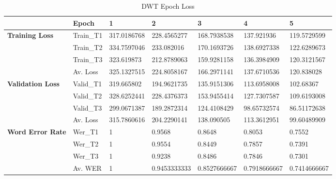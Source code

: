 \begin{table}[!ht]
    \centering
    \caption{DWT Epoch Loss}
    \begin{adjustbox}{width=\textwidth,keepaspectratio}
    \begin{tabular}{|l|l|l|l|l|l|l|}
    \hline
        \textbf{} & \textbf{Epoch} & \textbf{1} & \textbf{2} & \textbf{3} & \textbf{4} & \textbf{5} \\ \hline
        \textbf{Training Loss} & Train\_T1 & 317.0186768 & 228.4565277 & 168.7938538 & 137.921936 & 119.5729599 \\ \hline
        \textbf{} & Train\_T2 & 334.7597046 & 233.082016 & 170.1693726 & 138.6927338 & 122.6289673 \\ \hline
        \textbf{} & Train\_T3 & 323.619873 & 212.8789063 & 159.9281158 & 136.3984909 & 120.3121567 \\ \hline
        \textbf{} & Av. Loss & 325.1327515 & 224.8058167 & 166.2971141 & 137.6710536 & 120.838028 \\ \hline
        \textbf{Validation Loss} & Valid\_T1 & 319.665802 & 194.9621735 & 135.9151306 & 113.6958008 & 102.68367 \\ \hline
        \textbf{} & Valid\_T2 & 328.6252441 & 228.4376373 & 153.9455414 & 127.7307587 & 109.6193008 \\ \hline
        \textbf{} & Valid\_T3 & 299.0671387 & 189.2872314 & 124.4108429 & 98.65732574 & 86.51172638 \\ \hline
        \textbf{} & Av. Loss & 315.7860616 & 204.2290141 & 138.090505 & 113.3612951 & 99.60489909 \\ \hline
        \textbf{Word Error Rate} & Wer\_T1 & 1 & 0.9568 & 0.8648 & 0.8053 & 0.7552 \\ \hline
        \textbf{} & Wer\_T2 & 1 & 0.9554 & 0.8449 & 0.7857 & 0.7391 \\ \hline
        \textbf{} & Wer\_T3 & 1 & 0.9238 & 0.8486 & 0.7846 & 0.7301 \\ \hline
        \textbf{} & Av. WER & 1 & 0.9453333333 & 0.8527666667 & 0.7918666667 & 0.7414666667 \\ \hline
    \end{tabular}
    \end{adjustbox}
    \label{dwt_epochloss}
\end{table}